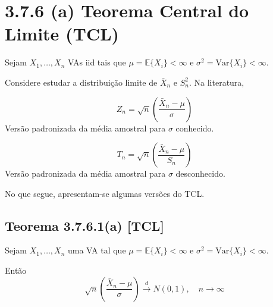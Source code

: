 \section*{3.7.6 (a) Teorema Central do Limite (TCL)}

Sejam $X_1, \ldots, X_n$ VAs iid tais que $\mu = \mathbb{E}\{X_i\} < \infty$ e $\sigma^2 = \mathrm{Var}\{X_i\} < \infty$.

Considere estudar a distribuição limite de $\bar{X}_n$ e $S_n^2$. Na literatura,

\begin{equation}
Z_n = \sqrt{n} \left( \frac{\bar{X}_n - \mu}{\sigma} \right)
\end{equation}
Versão padronizada da média amostral para $\sigma$ conhecido.

\begin{equation}
T_n = \sqrt{n} \left( \frac{\bar{X}_n - \mu}{S_n} \right)
\end{equation}
Versão padronizada da média amostral para $\sigma$ desconhecido.

No que segue, apresentam-se algumas versões do TCL.

\subsection*{Teorema 3.7.6.1(a) [TCL]}
Sejam $X_1, \ldots, X_n$ uma VA tal que $\mu = \mathbb{E}\{X_i\} < \infty$ e $\sigma^2 = \mathrm{Var}\{X_i\} < \infty$.

Então
\begin{equation}
\sqrt{n} \left( \frac{\bar{X}_n - \mu}{\sigma} \right) \xrightarrow{d} N(0,1), \quad n \to \infty
\end{equation}